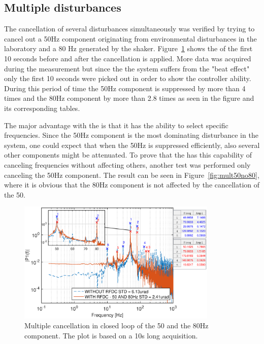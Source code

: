 \subsection{Multiple disturbances}
The cancellation of several disturbances simultaneously was verified by trying to cancel out a 50Hz component originating from environmental disturbances in the laboratory and a 80 Hz generated by the shaker. Figure~\ref{fig:mult5080} shows the \abbrFFT of the first 10 seconds before and after the cancellation is applied. More data was acquired during the measurement but since the the system suffers from the "beat effect" only the first 10 seconds were picked out in order to show the controller ability. During this period of time the 50Hz component is suppressed by more than 4 times and the 80Hz component by more than 2.8 times as seen in the figure and its corresponding tables.

The major advantage with the \abbrRFDC is that it has the ability to select specific frequencies. Since the 50Hz component is the most dominating disturbance in the system, one could expect that when the 50Hz is suppressed efficiently, also several other components might be attenuated. To prove that the \abbrRFDC has this capability of canceling frequencies without affecting others, another test was performed only canceling the 50Hz component. The result can be seen in Figure~\ref{fig:mult50no80}, where it is obvious that the 80Hz component is not affected by the cancellation of the 50.

\begin{figure}[h]
  \centering %
  \includegraphics[width=0.85\textwidth]{fig/matlab/mult_50_80_closed_loop}
  \caption{\label{fig:mult5080} Multiple cancellation in closed loop of the 50 and the 80Hz component. The plot is based on a 10s long acquisition.}
\end{figure}

